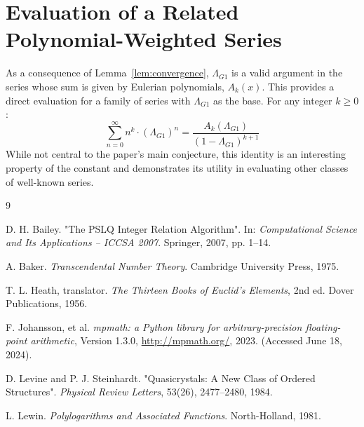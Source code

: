 \documentclass{amsart}
\theoremstyle{plain}
\theoremstyle{definition}
\theoremstyle{remark}
\newcommand{\LambdaG}{\Lambda_{G1}}
\begin{document}
\section{Evaluation of a Related Polynomial-Weighted Series}
As a consequence of Lemma~\ref{lem:convergence}, $\LambdaG$ is a valid argument in the series whose sum is given by Eulerian polynomials, $A_k(x)$. This provides a direct evaluation for a family of series with $\LambdaG$ as the base. For any integer $k \ge 0$:
\[ \sum_{n=0}^{\infty} n^k \cdot (\LambdaG)^n = \frac{A_k(\LambdaG)}{(1-\LambdaG)^{k+1}} \]
While not central to the paper's main conjecture, this identity is an interesting property of the constant and demonstrates its utility in evaluating other classes of well-known series.

\begin{thebibliography}{9}

D. H. Bailey. "The PSLQ Integer Relation Algorithm". In: \textit{Computational Science and Its Applications -- ICCSA 2007}. Springer, 2007, pp. 1--14.

A. Baker. \textit{Transcendental Number Theory}. Cambridge University Press, 1975. 

T. L. Heath, translator. \textit{The Thirteen Books of Euclid's Elements}, 2nd ed. Dover Publications, 1956. 

F. Johansson, et al. \textit{mpmath: a Python library for arbitrary-precision floating-point arithmetic}, Version 1.3.0, \url{http://mpmath.org/}, 2023. (Accessed June 18, 2024). 

D. Levine and P. J. Steinhardt. "Quasicrystals: A New Class of Ordered Structures". \textit{Physical Review Letters}, 53(26), 2477--2480, 1984. 

L. Lewin. \textit{Polylogarithms and Associated Functions}. North-Holland, 1981.

\end{thebibliography}
\end{document}
